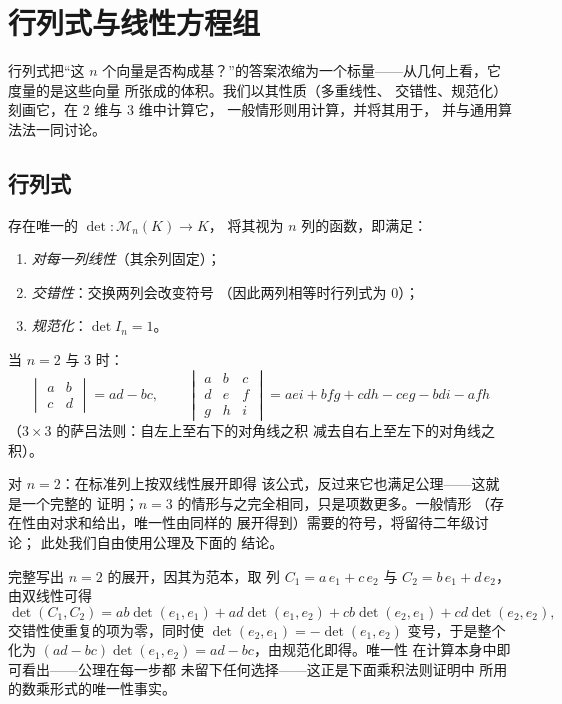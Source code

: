 \chapter{行列式与线性方程组}\label{ch:b1:det}

行列式把“这
$n$ 个向量是否构成基？”的答案浓缩为一个标量——从几何上看，它度量的是这些向量
所张成的体积。我们以其性质（多重线性、
交错性、规范化）刻画它，在 $2$ 维与 $3$ 维中计算它，
一般情形则用计算，并将其用于，
并与通用算法法一同讨论。

\section{行列式}

\begin{theorem}[刻画]\label{thm:b1:det:def}
存在唯一的 $\det \colon \mathcal{M}_n(K) \to K$，
将其视为 $n$ 列的函数，即满足：
\begin{enumerate}
  \item \emph{对每一列线性}（其余列固定）；
  \item \emph{交错性}：交换两列会改变符号
        （因此两列相等时行列式为 $0$）；
  \item \emph{规范化}：$\det I_n = 1$。
\end{enumerate}
当 $n = 2$ 与 $3$ 时：
\[
\begin{vmatrix} a & b\\ c & d\end{vmatrix} = ad - bc,
\qquad
\begin{vmatrix} a & b & c\\ d & e & f\\ g & h & i\end{vmatrix}
= aei + bfg + cdh - ceg - bdi - afh
\]
（$3 \times 3$ 的萨吕法则：自左上至右下的对角线之积
减去自右上至左下的对角线之积）。
\end{theorem}
\admitted

\begin{remark}
对 $n = 2$：在标准列上按双线性展开即得
该公式，反过来它也满足公理——这就是一个完整的
证明；$n = 3$ 的情形与之完全相同，只是项数更多。一般情形
（存在性由对求和给出，唯一性由同样的
展开得到）需要的符号，将留待二年级讨论；
此处我们自由使用公理及下面的
结论。

完整写出 $n = 2$ 的展开，因其为范本，取
列 $C_1 = a\,e_1 + c\,e_2$ 与 $C_2 = b\,e_1 + d\,e_2$，
由双线性可得
\[
\det(C_1, C_2) = ab\det(e_1, e_1) + ad\det(e_1, e_2)
+ cb\det(e_2, e_1) + cd\det(e_2, e_2),
\]
交错性使重复的项为零，同时使
$\det(e_2, e_1) = -\det(e_1, e_2)$ 变号，于是整个化为
$(ad - bc)\det(e_1, e_2) = ad - bc$，由规范化即得。唯一性
在计算本身中即可看出——公理在每一步都
未留下任何选择——这正是下面乘积法则证明中
所用的数乘形式的唯一性事实。
\end{remark}

